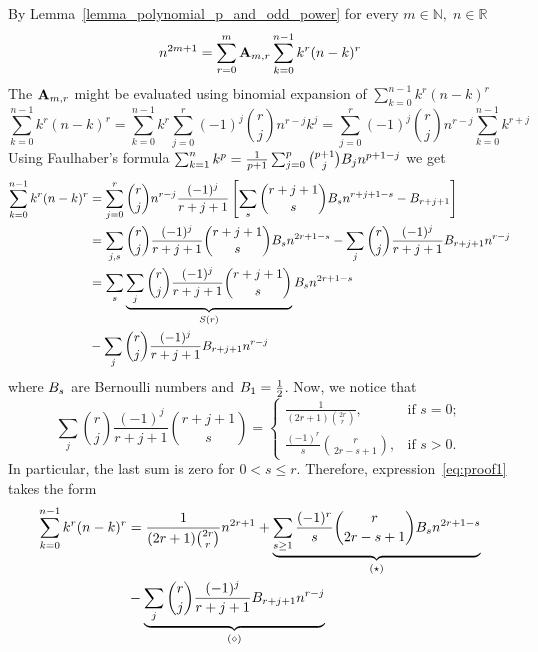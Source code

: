By Lemma~\ref{lemma_polynomial_p_and_odd_power} for every $m\in\mathbb{N}, \; n\in\mathbb{R}$
\begin{equation}
    \label{eq:current_a_def}
    n^{2m+1} = \sum_{r=0}^{m} {\mathbf{A}} \sb{m,r} \sum_{k=0}^{n-1} k^r (n-k)^r
\end{equation}
The ${\mathbf{A}} \sb{m,r}$ might be evaluated using binomial expansion of $\sum_{k=0}^{n-1} k^r (n-k)^r$
\begin{equation*}
    \sum_{k=0}^{n-1} k^r (n-k)^r
    =\sum_{k=0}^{n-1} k^r \sum_{j=0}^{r} (-1)^j \binom{r}{j} n^{r-j} k^{j}
    =\sum_{j=0}^{r} (-1)^j \binom{r}{j} n^{r-j} \sum_{k=0}^{n-1} k^{r+j}
\end{equation*}
Using Faulhaber's formula $\sum_{k=1}^{n} k^{p} = \frac{1}{p+1}\sum_{j=0}^{p} \binom{p+1}{j}
{B}\sb{j} n^{p+1-j}$ we get
\begin{equation}
    \label{eq:proof1}
    \begin{split}
        \sum_{k=0}^{n-1} k^r (n-k)^r
        &=\sum_{j=0}^{r} \binom{r}{j} n^{r-j} \frac{(-1)^j}{r+j+1}
        \left[\sum_{s} \binom{r+j+1}{s} {B}\sb{s} n^{r+j+1-s} - {B}\sb{r+j+1} \right] \\
        &=\sum_{j,s} \binom{r}{j} \frac{(-1)^j}{r+j+1} \binom{r+j+1}{s} {B}\sb{s} n^{2r+1-s}
        -\sum_{j} \binom{r}{j} \frac{(-1)^j}{r+j+1} {B}\sb{r+j+1} n^{r-j} \\
        &=\sum_{s} \underbrace{\sum_{j} \binom{r}{j} \frac{(-1)^j}{r+j+1} \binom{r+j+1}{s}}_{S(r)}
        {B}\sb{s} n^{2r+1-s} \\
        &-\sum_{j} \binom{r}{j} \frac{(-1)^j}{r+j+1} {B}\sb{r+j+1} n^{r-j}
    \end{split}
\end{equation}
where ${B}\sb{s}$ are Bernoulli numbers and ${B}\sb{1}=\frac{1}{2}$.
Now, we notice that
\begin{equation*}
    \sum_{j} \binom{r}{j} \frac{(-1)^j}{r+j+1} \binom{r+j+1}{s}
    =\begin{cases}
         \frac{1}{(2r+1) \binom{2r}r}, & \text{if } s=0;\\
         \frac{(-1)^r}{s} \binom{r}{2r-s+1}, & \text{if } s>0.
    \end{cases}
\end{equation*}
In particular, the last sum is zero for $0<s\leq r$.
Therefore, expression~\eqref{eq:proof1} takes the form
\begin{equation*}
    \begin{split}
        \sum_{k=0}^{n-1} k^r (n-k)^r
        &=\frac{1}{(2r+1) \binom{2r}{r}} n^{2r+1}
        +\underbrace{\sum_{s \geq 1} \frac{(-1)^r}{s} \binom{r}{2r-s+1} {B}\sb{s} n^{2r+1-s}}_{(\star)} \\
        &-\underbrace{\sum_{j} \binom{r}{j} \frac{(-1)^j}{r+j+1} {B}\sb{r+j+1} n^{r-j}}_{(\diamond)}
    \end{split}
\end{equation*}
